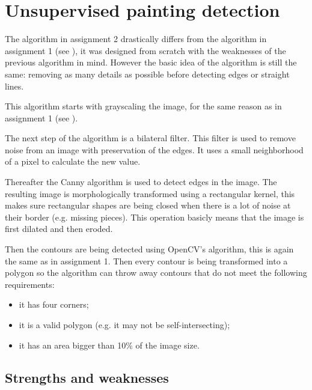 \section{Unsupervised painting detection}
\label{sec:unsupervised_painting_detection}
The algorithm in assignment 2 drastically differs from the algorithm in assignment 1 (see ), it was designed from scratch with the weaknesses of the previous algorithm in mind. However the basic idea of the algorithm is still the same: removing as many details as possible before detecting edges or straight lines.


This algorithm starts with grayscaling the image, for the same reason as in assignment 1 (see ).

The next step of the algorithm is a bilateral filter. This filter is used to remove noise from an image with preservation of the edges. It uses a small neighborhood of a pixel to calculate the new value. \cite{BilateralFilter}

Thereafter the Canny algorithm is used to detect edges in the image. The resulting image is morphologically transformed using a rectangular kernel, this makes sure rectangular shapes are being closed when there is a lot of noise at their border (e.g. missing pieces). This operation basicly means that the image is first dilated and then eroded.

Then the contours are being detected using OpenCV's algorithm, this is again the same as in assignment 1. Then every contour is being transformed into a polygon so the algorithm can throw away contours that do not meet the following requirements:

\begin{itemize}
  \item it has four corners;
  \item it is a valid polygon (e.g. it may not be self-intersecting);
  \item it has an area bigger than 10\% of the image size.
\end{itemize}


\subsection{Strengths and weaknesses}

